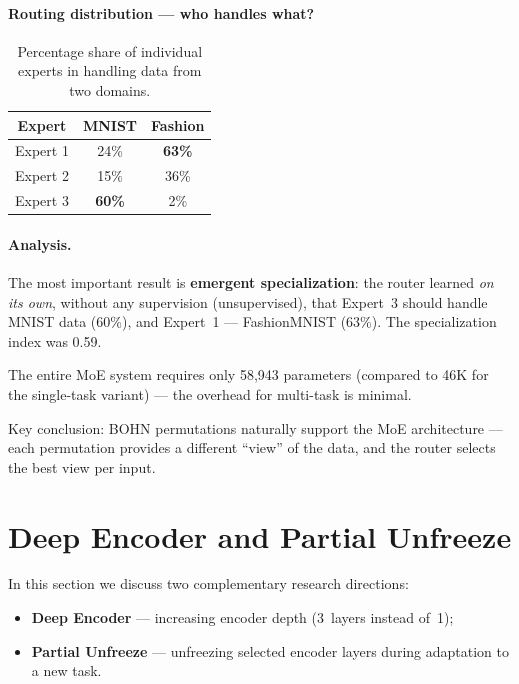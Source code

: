 \documentclass[11pt,a4paper]{report}
\begin{document}
\paragraph{Routing distribution --- who handles what?}

\begin{table}[h!]
\centering
\caption{Percentage share of individual experts in handling data from two domains.}
\begin{tabular}{c c c}
\hline
\textbf{Expert} & \textbf{MNIST} & \textbf{Fashion} \\
\hline
Expert 1 & 24\% & \textbf{63\%} \\
Expert 2 & 15\% & 36\% \\
Expert 3 & \textbf{60\%} & 2\% \\
\hline
\end{tabular}
\label{tab:moe_routing_distribution}
\end{table}

\paragraph{Analysis.}
The most important result is \textbf{emergent specialization}: the router learned
\emph{on its own}, without any supervision (unsupervised), that Expert~3 should handle
MNIST data (60\%), and Expert~1 --- FashionMNIST (63\%). The specialization index was 0.59.

The entire MoE system requires only 58,943 parameters (compared to 46K for the single-task variant) ---
the overhead for multi-task is minimal.

Key conclusion: BOHN permutations naturally support the MoE architecture ---
each permutation provides a different ``view'' of the data, and the router selects the best view per input.


\section{Deep Encoder and Partial Unfreeze}
\label{sec:deep_partial}

In this section we discuss two complementary research directions:
\begin{itemize}
    \item \textbf{Deep Encoder} --- increasing encoder depth (3~layers instead of~1);
    \item \textbf{Partial Unfreeze} --- unfreezing selected encoder layers during adaptation to a new task.
\end{itemize}
\end{document}
